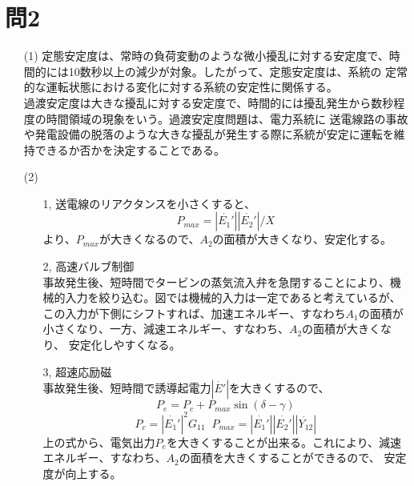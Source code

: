 \documentclass{jsarticle}
\begin{document}
\section{問2}
\begin{itemize}
 \item [(1)]
定態安定度は、常時の負荷変動のような微小擾乱に対する安定度で、時間的には10数秒以上の減少が対象。したがって、定態安定度は、系統の
定常的な運転状態における変化に対する系統の安定性に関係する。\\
過渡安定度は大きな擾乱に対する安定度で、時間的には擾乱発生から数秒程度の時間領域の現象をいう。過渡安定度問題は、電力系統に
送電線路の事故や発電設備の脱落のような大きな擾乱が発生する際に系統が安定に運転を維持できるか否かを決定することである。
 \item[(2)]
\begin{itemize}
 \item [1,]
送電線のリアクタンスを小さくすると、
       \begin{equation}
	P_{max}=|\dot{E_{1}'}||\dot{E_{2}'}|/X
       \end{equation}
       より、$P_{max}$が大きくなるので、$A_{2}$の面積が大きくなり、安定化する。
 \item [2,]高速バルブ制御\\
       事故発生後、短時間でタービンの蒸気流入弁を急閉することにより、機械的入力を絞り込む。図では機械的入力は一定であると考えているが、
       この入力が下側にシフトすれば、加速エネルギー、すなわち$A_{1}$の面積が小さくなり、一方、減速エネルギー、すなわち、$A_{2}$の面積が大きくなり、
       安定化しやすくなる。
 \item [3,]超速応励磁\\
       事故発生後、短時間で誘導起電力$|\dot{E'}|$を大きくするので、
       \begin{equation}
	P_{e}=P_{c}+P_{max}\sin(\delta - \gamma)
       \end{equation}
       \begin{equation}
	P_{c}=|\dot{E_{1}'}|^{2}G_{11} \;\; P_{max} = |\dot{E_{1}'}||\dot{E_{2}'}||\dot{Y_{12}}|
       \end{equation}
       上の式から、電気出力$P_{e}$を大きくすることが出来る。これにより、減速エネルギー、すなわち、$A_{2}$の面積を大きくすることができるので、
       安定度が向上する。
\end{itemize}
\end{itemize}
\end{document}
